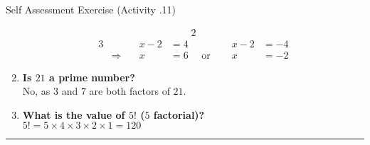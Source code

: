 \documentclass[../notes.tex]{subfiles}
\begin{document}
\begin{exercise}{Self Assessment Exercise (Activity \thechapter.11)}
\begin{enumerate}
\begin{alignat*}{2}
						\end{alignat*}
						\begin{alignat*}{3}
							& \qquad &x - 2 &= 4 \qquad &x - 2 &= -4\\
							& \Rightarrow \quad &x &= 6 \quad \text{ or } \quad &x &= -2 
						\end{alignat*}
					\item \textbf{Is $21$ a prime number?}\\
						No, as $3$ and $7$ are both factors of $21$.
					\item \textbf{What is the value of $5!$ ($5$ factorial)?}\\
						$5! = 5 \times 4 \times 3 \times 2 \times 1 = 120$
				\end{enumerate}
			\end{exercise}
		\noindent\rule{\textwidth}{0.4pt}
\end{document}
